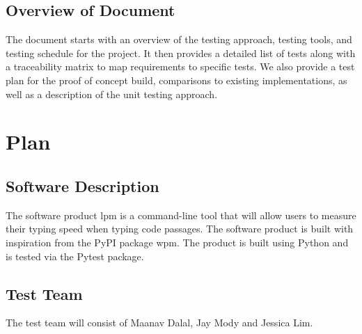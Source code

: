 \documentclass[12pt, titlepage]{article}
\begin{document}




\subsection{Overview of Document}

The document starts with an overview of the testing approach, testing tools, and testing schedule for the project. It then provides a detailed list of tests along with a traceability matrix to map requirements to specific tests. We also provide a test plan for the proof of concept build, comparisons to existing implementations, as well as a description of the unit testing approach.

\section{Plan}

\subsection{Software Description}

The software product lpm is a command-line tool that will allow users to measure their typing speed when typing code passages. The software product is built with inspiration from the PyPI package wpm. The product is built using Python and is tested via the Pytest package.

\subsection{Test Team}

The test team will consist of Maanav Dalal, Jay Mody and Jessica Lim.
\end{document}
